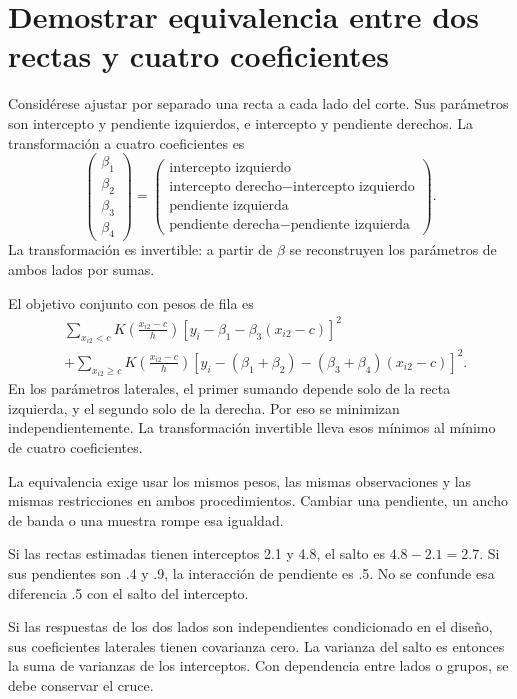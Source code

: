 \documentclass[11pt,a4paper]{article}
\begin{document}
\section{Demostrar equivalencia entre dos rectas y cuatro coeficientes}\label{unidad23}
Considérese ajustar por separado una recta
a cada lado del corte.
Sus parámetros son intercepto y pendiente
izquierdos, e intercepto y pendiente derechos.
La transformación a cuatro coeficientes es
\[
\begin{pmatrix}
\beta_1\\\beta_2\\\beta_3\\\beta_4
\end{pmatrix}
=
\begin{pmatrix}
\text{intercepto izquierdo}\\
\text{intercepto derecho}-\text{intercepto izquierdo}\\
\text{pendiente izquierda}\\
\text{pendiente derecha}-\text{pendiente izquierda}
\end{pmatrix}.
\]
La transformación es invertible:
a partir de \(\beta\) se reconstruyen
los parámetros de ambos lados por sumas.

El objetivo conjunto con pesos de fila es
\[
\begin{aligned}
&\sum_{x_{i2}<c}K\left(\frac{x_{i2}-c}{h}\right)
[y_i-\beta_1-\beta_3(x_{i2}-c)]^2\\
&+\sum_{x_{i2}\ge c}K\left(\frac{x_{i2}-c}{h}\right)
[y_i-(\beta_1+\beta_2)-(\beta_3+\beta_4)(x_{i2}-c)]^2.
\end{aligned}
\]
En los parámetros laterales, el primer sumando
depende solo de la recta izquierda,
y el segundo solo de la derecha.
Por eso se minimizan independientemente.
La transformación invertible lleva esos
mínimos al mínimo de cuatro coeficientes.

La equivalencia exige usar los mismos pesos,
las mismas observaciones y las mismas
restricciones en ambos procedimientos.
Cambiar una pendiente, un ancho de banda
o una muestra rompe esa igualdad.

\begin{ejemplo}
Si las rectas estimadas tienen interceptos
2.1 y 4.8, el salto es \(4.8-2.1=2.7\).
Si sus pendientes son .4 y .9,
la interacción de pendiente es .5.
No se confunde esa diferencia .5
con el salto del intercepto.
\end{ejemplo}
Si las respuestas de los dos lados son
independientes condicionado en el diseño,
sus coeficientes laterales tienen covarianza cero.
La varianza del salto es entonces
la suma de varianzas de los interceptos.
Con dependencia entre lados o grupos,
se debe conservar el cruce.
\end{document}
